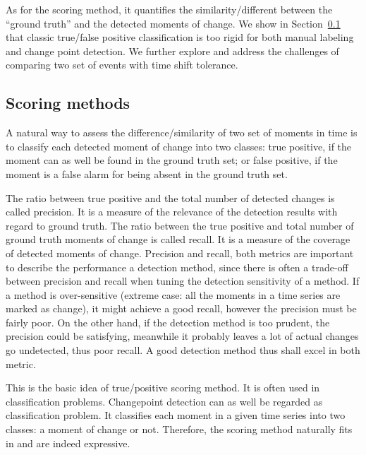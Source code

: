 As for the scoring method, it quantifies the similarity/different between the ``ground truth'' and the detected moments of change.
We show in Section~\ref{sec:score} that classic true/false positive classification is too rigid for both manual labeling and change point detection.
We further explore and address the challenges of comparing two set of events with time shift tolerance.

\subsection{Scoring methods}
\label{sec:score}

A natural way to assess the difference/similarity of two set of moments in time is to classify each detected moment of change into two classes: true positive, if the moment can as well be found in the ground truth set; or false positive, if the moment is a false alarm for being absent in the ground truth set.

The ratio between true positive and the total number of detected changes is called precision.
It is a measure of the relevance of the detection results with regard to ground truth.
The ratio between the true positive and total number of ground truth moments of change is called recall.
It is a measure of the coverage of detected moments of change.
Precision and recall, both metrics are important to describe the performance a detection method, since there is often a trade-off between precision and recall when tuning the detection sensitivity of a method.
If a method is over-sensitive (extreme case: all the moments in a time series are marked as change), it might achieve a good recall,  however the precision must be fairly poor.
On the other hand, if the detection method is too prudent, the precision could be satisfying, meanwhile it probably leaves a lot of actual changes go undetected, thus poor recall.
A good detection method thus shall excel in both metric.

This is the basic idea of true/positive scoring method.
It is often used in classification problems.
Changepoint detection can as well be regarded as classification problem.
It classifies each moment in a given time series into two classes: a moment of change or not.
Therefore, the scoring method naturally fits in and are indeed expressive.

